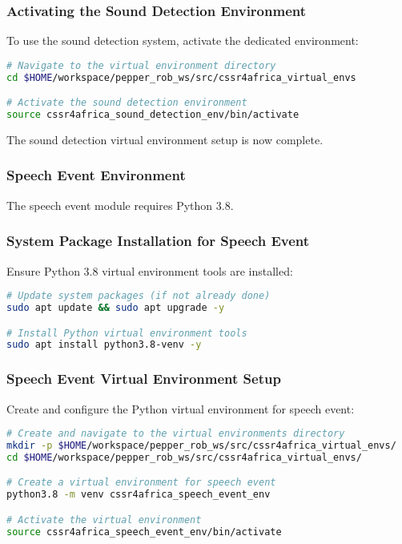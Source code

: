 \documentclass{CSSRforAfrica}
\begin{document}
{\subsubsection*{Activating the Sound Detection Environment}
To use the sound detection system, activate the dedicated environment:
\begin{lstlisting}[style=withoutNumbering, language=bash]
# Navigate to the virtual environment directory
cd $HOME/workspace/pepper_rob_ws/src/cssr4africa_virtual_envs

# Activate the sound detection environment
source cssr4africa_sound_detection_env/bin/activate
\end{lstlisting}

The sound detection virtual environment setup is now complete.

\subsubsection*{Speech Event Environment}
The speech event module requires Python 3.8.

\subsubsection*{System Package Installation for Speech Event}
Ensure Python 3.8 virtual environment tools are installed:
\begin{lstlisting}[style=withoutNumbering, language=bash]
# Update system packages (if not already done)
sudo apt update && sudo apt upgrade -y

# Install Python virtual environment tools
sudo apt install python3.8-venv -y
\end{lstlisting}

\subsubsection*{Speech Event Virtual Environment Setup}
Create and configure the Python virtual environment for speech event:
\begin{lstlisting}[style=withoutNumbering, language=bash]
# Create and navigate to the virtual environments directory
mkdir -p $HOME/workspace/pepper_rob_ws/src/cssr4africa_virtual_envs/
cd $HOME/workspace/pepper_rob_ws/src/cssr4africa_virtual_envs/

# Create a virtual environment for speech event
python3.8 -m venv cssr4africa_speech_event_env

# Activate the virtual environment
source cssr4africa_speech_event_env/bin/activate


\end{lstlisting}}
\end{document}
